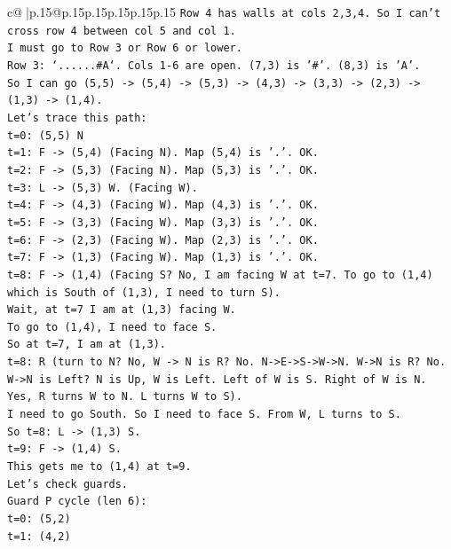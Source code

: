 \documentclass{article}
\begin{document}
{\begin{supertabular}{c@{$\;$}|p{.15\linewidth}@{}p{.15\linewidth}p{.15\linewidth}p{.15\linewidth}p{.15\linewidth}p{.15\linewidth}}
{{{\texttt{Row 4 has walls at cols 2,3,4. So I can't cross row 4 between col 5 and col 1.} \\
\texttt{I must go to Row 3 or Row 6 or lower.} \\
\texttt{Row 3: `......\#A`. Cols 1{-}6 are open. (7,3) is '\#'. (8,3) is 'A'.} \\
\texttt{So I can go (5,5) {-}> (5,4) {-}> (5,3) {-}> (4,3) {-}> (3,3) {-}> (2,3) {-}> (1,3) {-}> (1,4).} \\
\texttt{Let's trace this path:} \\
\texttt{t=0: (5,5) N} \\
\texttt{t=1: F {-}> (5,4) (Facing N). Map (5,4) is '.'. OK.} \\
\texttt{t=2: F {-}> (5,3) (Facing N). Map (5,3) is '.'. OK.} \\
\texttt{t=3: L {-}> (5,3) W. (Facing W).} \\
\texttt{t=4: F {-}> (4,3) (Facing W). Map (4,3) is '.'. OK.} \\
\texttt{t=5: F {-}> (3,3) (Facing W). Map (3,3) is '.'. OK.} \\
\texttt{t=6: F {-}> (2,3) (Facing W). Map (2,3) is '.'. OK.} \\
\texttt{t=7: F {-}> (1,3) (Facing W). Map (1,3) is '.'. OK.} \\
\texttt{t=8: F {-}> (1,4) (Facing S? No, I am facing W at t=7. To go to (1,4) which is South of (1,3), I need to turn S).} \\
\texttt{Wait, at t=7 I am at (1,3) facing W.} \\
\texttt{To go to (1,4), I need to face S.} \\
\texttt{So at t=7, I am at (1,3).} \\
\texttt{t=8: R (turn to N? No, W {-}> N is R? No. N{-}>E{-}>S{-}>W{-}>N. W{-}>N is R? No. W{-}>N is Left? N is Up, W is Left. Left of W is S. Right of W is N. Yes, R turns W to N. L turns W to S).} \\
\texttt{I need to go South. So I need to face S. From W, L turns to S.} \\
\texttt{So t=8: L {-}> (1,3) S.} \\
\texttt{t=9: F {-}> (1,4) S.} \\
\texttt{This gets me to (1,4) at t=9.} \\
\texttt{Let's check guards.} \\
\texttt{Guard P cycle (len 6):} \\
\texttt{t=0: (5,2)} \\
\texttt{t=1: (4,2)} \\
}}}
\end{supertabular}}
\end{document}
